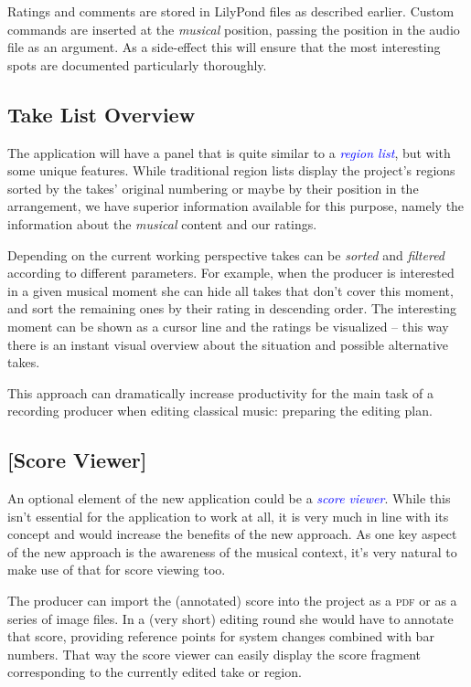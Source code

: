 \documentclass[11pt,a4paper]{article}
\newcommand*{\term}[1]{\textcolor{blue}{\emph{#1}}}
\begin{document}
Ratings and comments are stored in LilyPond files as described earlier. Custom
commands are inserted at the \emph{musical} position, passing the position in
the audio file as an argument. As a side-effect this will ensure that the most
interesting spots are documented particularly thoroughly.


\subsection{Take List Overview}
The application will have a panel that is quite similar to a \term{region
list}, but with some unique features.
While traditional region lists display the project's regions sorted by the
takes' original numbering or maybe by their position in the arrangement, we have
superior information available for this purpose, namely the information about the
\emph{musical} content and our ratings.

Depending on the current working perspective takes can be \emph{sorted} and 
\emph{filtered} according to different parameters.
For example, when the producer is interested in a given musical moment she can hide all
takes that don't cover this moment, and sort the remaining ones by their rating
in descending order.
The interesting moment can be shown as a cursor line and the ratings be visualized
-- this way there is an instant visual overview about the situation and possible
alternative takes.

This approach can dramatically increase productivity for the main task of a recording
producer when editing classical music: preparing the editing plan.

\subsection{[Score Viewer]}
An optional element of the new application could be a \term{score viewer}.
While this isn't essential for the application to work at all, it is very much in
line with its concept and would increase the benefits of the new approach.
As one key aspect of the new approach is the awareness of the musical context,
it's very natural to make use of that for score viewing too.

The producer can import the (annotated) score into the project as a \textsc{pdf} or as a
series of image files.
In a (very short) editing round she would have to annotate that score, providing
reference points for system changes combined with bar numbers.
That way the score viewer can easily display the score fragment corresponding to
the currently edited take or region.
\end{document}
